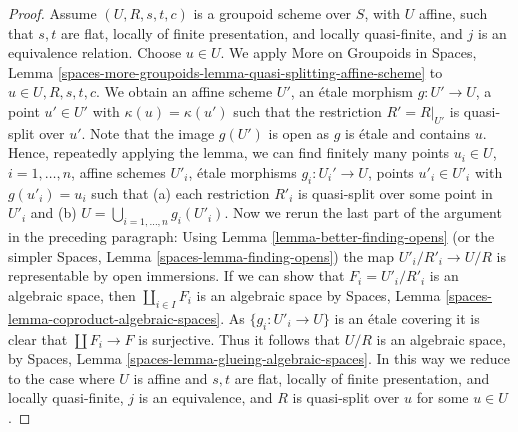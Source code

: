 \documentclass[10pt,a4paper]{amsart}
\theoremstyle{plain}
\theoremstyle{definition}
\theoremstyle{remark}
\numberwithin{equation}{subsection}
\begin{document}
\begin{proof}
\medskip\noindent
Assume $(U, R, s, t, c)$ is a groupoid scheme over $S$,
with $U$ affine, such that $s, t$ are flat, locally of finite presentation,
and locally quasi-finite, and $j$ is an equivalence relation.
Choose $u \in U$. We apply
More on Groupoids in Spaces,
Lemma \ref{spaces-more-groupoids-lemma-quasi-splitting-affine-scheme}
to $u \in U, R, s, t, c$. We obtain an affine scheme $U'$, an \'etale
morphism $g : U' \to U$, a point $u' \in U'$ with $\kappa(u) = \kappa(u')$
such that the restriction $R' = R|_{U'}$ is quasi-split over $u'$.
Note that the image $g(U')$ is open as $g$ is \'etale and contains $u$.
Hence, repeatedly applying the lemma, we can find finitely many
points $u_i \in U$, $i = 1, \ldots, n$,
affine schemes $U'_i$, \'etale morphisms $g_i : U_i' \to U$, points
$u'_i \in U'_i$ with $g(u'_i) = u_i$ such that (a) each
restriction $R'_i$ is quasi-split over some point in $U'_i$ and
(b) $U = \bigcup_{i = 1, \ldots, n} g_i(U'_i)$.
Now we rerun the last part of the argument in the preceding paragraph:
Using
Lemma \ref{lemma-better-finding-opens}
(or the simpler
Spaces, Lemma \ref{spaces-lemma-finding-opens})
the map $U'_i/R'_i \to U/R$ is representable by open immersions.
If we can show that $F_i = U'_i/R'_i$ is an algebraic space, then
$\coprod_{i \in I} F_i$ is an algebraic space by
Spaces, Lemma \ref{spaces-lemma-coproduct-algebraic-spaces}.
As $\{g_i : U'_i \to U\}$ is an \'etale covering
it is clear that $\coprod F_i \to F$ is surjective. Thus
it follows that $U/R$ is an algebraic space, by
Spaces, Lemma \ref{spaces-lemma-glueing-algebraic-spaces}.
In this way we reduce to the case where $U$ is affine and $s, t$ are flat,
locally of finite presentation, and locally quasi-finite,
$j$ is an equivalence, and $R$ is quasi-split over $u$ for some
$u \in U$.


\end{proof}
\end{document}

